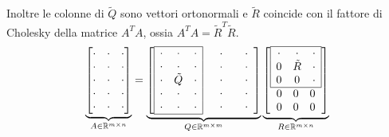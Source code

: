 Inoltre le colonne di $\tilde{Q}$ sono vettori ortonormali e $\tilde{R}$ coincide con il fattore di Cholesky della matrice $A^{T} A$, ossia $A^{T} A=\tilde{R}^{T}\tilde{R}$.
\begin{equation*}
\underbrace{\begin{bmatrix}
\cdot  & \cdot  & \cdot \\
\cdot  & \cdot  & \cdot \\
\cdot  & \cdot  & \cdot \\
\cdot  & \cdot  & \cdot \\
\cdot  & \cdot  & \cdot
\end{bmatrix}}_{A\in \mathbb{R}^{m\times n}} =\underbrace{\begin{bmatrix}
\begin{array}{|c c c|}
\hline
\cdot  & \cdot  & \cdot \\
\cdot  & \cdot  & \cdot \\
\cdot  & \tilde{Q} & \cdot \\
\cdot  & \cdot  & \cdot \\
\cdot  & \cdot  & \cdot \\
\hline
\end{array} & \begin{array}{ c }
\cdot \\
\cdot \\
\cdot \\
\cdot \\
\cdot
\end{array} & \begin{array}{ c }
\cdot \\
\cdot \\
\cdot \\
\cdot \\
\cdot
\end{array}
\end{bmatrix}}_{Q\in \mathbb{R}^{m\times m}}\underbrace{\begin{bmatrix}
\begin{array}{|c c c|}
\hline
\cdot  & \cdot  & \cdot \\
0 & \tilde{R} & \cdot \\
0 & 0 & \cdot \\
\hline
\end{array}\\
\begin{array}{ c c c }
0 & 0 & 0
\end{array}\\
\begin{array}{ c c c }
0 & 0 & 0
\end{array}
\end{bmatrix}}_{R\in \mathbb{R}^{m\times n}}
\end{equation*}

